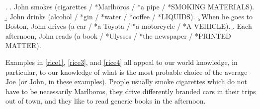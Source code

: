 \ex. \label{rice} \a. \label{rice1} John smokes (cigarettes / *Marlboros / *a pipe / *SMOKING MATERIALS).
\b. \label{rice2} John drinks (alcohol / *gin / *water / *coffee / *LIQUIDS).
\c. \label{rice3} When he goes to Boston, John drives (a car / *a Toyota / *a motorcycle / *A VEHICLE).
\d. \label{rice4} Each afternoon, John reads (a book / *Ulysses / *the newspaper / *PRINTED MATTER).

Examples in \ref{rice1}, \ref{rice3}, and \ref{rice4} all appeal to our world knowledge, in particular, to our knowledge of what is the most probable choice of the average Joe (or John, in these examples). People usually smoke cigarettes which do not have to be necessarily Marlboros, they drive differently branded cars in their trips out of town, and they like to read generic books in the afternoon.\\
